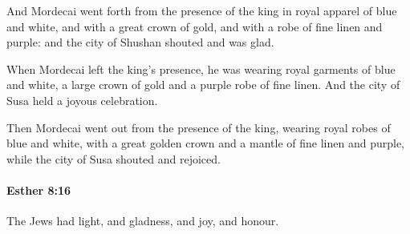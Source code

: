 			\begin{versebox}
					\item[BHS] 
					\item[LXX] 
					\item[ASV] And Mordecai went forth from the presence of the king in royal apparel of blue and white, and with a great crown of gold, and with a robe of fine linen and purple: and the city of Shushan shouted and was glad.
					\item[NIV] When Mordecai left the king’s presence, he was wearing royal garments of blue and white, a large crown of gold and a purple robe of fine linen. And the city of Susa held a joyous celebration.
					\item[NRSV] Then Mordecai went out from the presence of the king, wearing royal robes of blue and white, with a great golden crown and a mantle of fine linen and purple, while the city of Susa shouted and rejoiced.
			\end{versebox}

		\paragraph{Esther 8:16} %
			\label{ESTHER-8-16}

			The Jews had light, and gladness, and joy, and honour.

